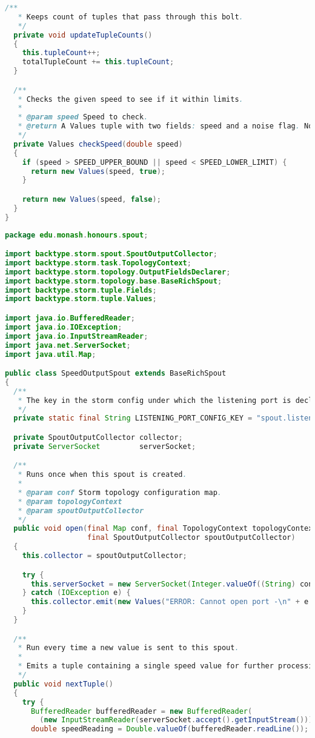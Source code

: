 \begin{lstlisting}[language=java,caption=edu.monash.honours.bolt.SpeedCheckBolt (Java)]
  /**
   * Keeps count of tuples that pass through this bolt.
   */
  private void updateTupleCounts()
  {
    this.tupleCount++;
    totalTupleCount += this.tupleCount;
  }

  /**
   * Checks the given speed to see if it within limits.
   *
   * @param speed Speed to check.
   * @return A Values tuple with two fields: speed and a noise flag. Noise flag is checked if speed exceeds limits.
   */
  private Values checkSpeed(double speed)
  {
    if (speed > SPEED_UPPER_BOUND || speed < SPEED_LOWER_LIMIT) {
      return new Values(speed, true);
    }

    return new Values(speed, false);
  }
}
\end{lstlisting}

\clearpage
\begin{lstlisting}[language=java,caption=edu.monash.honours.spout.SpeedOutputSpout (Java)]
package edu.monash.honours.spout;

import backtype.storm.spout.SpoutOutputCollector;
import backtype.storm.task.TopologyContext;
import backtype.storm.topology.OutputFieldsDeclarer;
import backtype.storm.topology.base.BaseRichSpout;
import backtype.storm.tuple.Fields;
import backtype.storm.tuple.Values;

import java.io.BufferedReader;
import java.io.IOException;
import java.io.InputStreamReader;
import java.net.ServerSocket;
import java.util.Map;

public class SpeedOutputSpout extends BaseRichSpout
{
  /**
   * The key in the storm config under which the listening port is declared
   */
  private static final String LISTENING_PORT_CONFIG_KEY = "spout.listeningPort";

  private SpoutOutputCollector collector;
  private ServerSocket         serverSocket;

  /**
   * Runs once when this spout is created.
   *
   * @param conf Storm topology configuration map.
   * @param topologyContext
   * @param spoutOutputCollector
   */
  public void open(final Map conf, final TopologyContext topologyContext,
                   final SpoutOutputCollector spoutOutputCollector)
  {
    this.collector = spoutOutputCollector;

    try {
      this.serverSocket = new ServerSocket(Integer.valueOf((String) conf.get(LISTENING_PORT_CONFIG_KEY)));
    } catch (IOException e) {
      this.collector.emit(new Values("ERROR: Cannot open port -\n" + e.getMessage()));
    }
  }

  /**
   * Run every time a new value is sent to this spout.
   *
   * Emits a tuple containing a single speed value for further processing.
   */
  public void nextTuple()
  {
    try {
      BufferedReader bufferedReader = new BufferedReader(
        (new InputStreamReader(serverSocket.accept().getInputStream())));
      double speedReading = Double.valueOf(bufferedReader.readLine());


\end{lstlisting}

